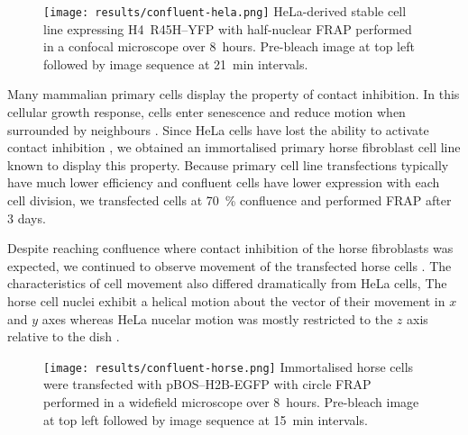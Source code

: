     \begin{figure}
      \centering
      \texttt{[image: results/confluent-hela.png]}
        {
          HeLa-derived stable cell line expressing H4~R45H--YFP
          with half-nuclear FRAP performed in a confocal microscope over 8~hours.
          Pre-bleach image at top left followed by image sequence at 21~min intervals.
        }
      \label{fig:kill-frap:confluent-hela}
    \end{figure}


    Many mammalian primary cells display the property of contact inhibition.
    In this cellular growth response, cells enter senescence and reduce motion
    when surrounded by neighbours . Since HeLa cells have 
    lost the ability to activate contact inhibition ,
    we obtained an immortalised primary horse fibroblast cell line known to display this property.
    Because primary cell line transfections typically have much lower efficiency
    and confluent cells have lower expression with each cell division,
    we transfected cells at \SI{70}{\percent} confluence and performed FRAP after 3 days.

    Despite reaching confluence where contact inhibition of the horse fibroblasts was expected, 
    we continued to observe movement of the transfected horse cells .
    The characteristics of cell movement also differed dramatically from HeLa cells,
    The horse cell nuclei exhibit a helical motion about the vector of their movement 
    in $x$ and $y$ axes 
    whereas HeLa nucelar motion was mostly restricted to the $z$ axis relative to the dish .

    \begin{figure}
      \centering
      \texttt{[image: results/confluent-horse.png]}
        {
          Immortalised horse cells were transfected with pBOS--H2B-EGFP
          with circle FRAP performed in a widefield microscope over 8~hours.
          Pre-bleach image at top left followed by image sequence at 15~min intervals.
        }
      \label{fig:kill-frap:confluent-horse}
    \end{figure}

